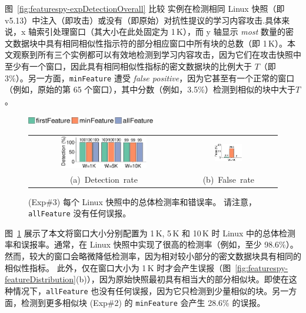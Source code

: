   图~\ref{fig:featurespy-expDetectionOverall} 比较 \sysnameF 实例在检测相同 Linux 快照（即 v5.13）中注入（即攻击）或没有（即原始）对抗性提议的学习内容攻击.具体来说，x 轴索引处理窗口（其大小在此处固定为 1\,K），而 y 轴显示 {\em most} 数量的密文数据块中具有相同相似性指示符的部分相应窗口中所有块的总数（即 1\,K）。本文观察到所有三个实例都可以有效地检测到学习内容攻击，因为它们在攻击快照中至少有一个窗口，因此具有相同相似性指标的密文数据块的比例大于 $T $（即 3\%）。另一方面，{\tt minFeature} 遭受 {\em false positive}，因为它甚至有一个正常的窗口（例如，原始的第 65 个窗口），其中分数（例如，3.5\%）检测到相似的块中大于$T$。


\begin{figure}[t]
    \centering
    \includegraphics[width=0.5\textwidth]{pic/featurespy/plot/detection/overall/effectiveness-falsePositive_legend.pdf}
    \vspace{5pt}\\
    \begin{tabular}{@{\ }c@{\ }c}
        \includegraphics[width=0.6\textwidth]{pic/featurespy/plot/detection/overall/effectivenessLinux.pdf} &
        \includegraphics[width=0.3\textwidth]{pic/featurespy/plot/detection/overall/falsePositiveLinux.pdf}\\
        \mbox{\small (a) Detection rate} &
        \mbox{\small (b) False rate}\\
    \end{tabular}
    \vspace{-6pt}
    \caption{(Exp\#3) 每个 Linux 快照中的总体检测率和错误率。 请注意，{\tt allFeature} 没有任何误报。}
    \vspace{-6pt}
    \label{fig:featurespy-expDetectionOverallFalsePositive}
\end{figure}

图~\ref{fig:featurespy-expDetectionOverallFalsePositive} 展示了本文将窗口大小分别配置为 1\,K, 5\,K 和 10\,K 时 Linux 中的总体检测率和误报率。通常，\sysnameF 在 Linux 快照中实现了很高的检测率（例如，至少 98.6\%）。然而，较大的窗口会略微降低检测率，因为相对较小部分的密文数据块具有相同的相似性指标。
此外，\sysnameF 仅在窗口大小为 1\,K 时才会产生误报（图~\ref{fig:featurespy-featureDistribution}(b)），因为原始快照最初具有相当大的部分相似块。即使在这种情况下，{\tt allFeature} 也没有任何误报，因为它只检测到少量相似的块。另一方面，检测到更多相似块 (Exp\#2) 的 {\tt minFeature} 会产生 28.6\% 的误报。


